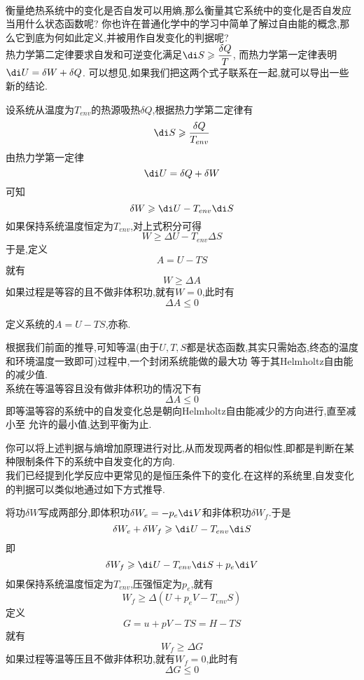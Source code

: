\documentclass{ctexart}
\begin{document}
\pagestyle{plain}
\noindent{}\vspace{15pt}\\
\indent 衡量绝热系统中的变化是否自发可以用熵,那么衡量其它系统中的变化是否自发应当用什么状态函数呢?%
你也许在普通化学中的学习中简单了解过自由能的概念,那么它到底为何如此定义,并被用作自发变化的判据呢?\vspace{12pt}\\
\indent 热力学第二定律要求自发和可逆变化满足$\di S\geqslant\dfrac{\delta Q}{T}$,%
而热力学第一定律表明$\di U=\delta W+\delta Q$.%
可以想见,如果我们把这两个式子联系在一起,就可以导出一些新的结论.
\begin{derivation}
    设系统从温度为$T_{env}$的热源吸热$\delta Q$,根据热力学第二定律有
    \[\di S\geqslant\dfrac{\delta Q}{T_{env}}\]
    由热力学第一定律
    \[\di U=\delta Q+\delta W\]
    可知
    \[\delta W\geqslant \di U-T_{env}\di S\]
    如果保持系统温度恒定为$T_{env}$,对上式积分可得
    \[W\geqslant \Delta U-T_{env}\Delta S\]
    于是,定义
    \[A=U-TS\]
    就有
    \[W\geqslant \Delta A\]
    如果过程是等容的且不做非体积功,就有$W=0$,此时有
    \[\Delta A\leqslant0\]

\end{derivation}
\begin{definition}
    定义系统的$A=U-TS$,亦称.
\end{definition}
\begin{theorem}[3E.1.2 Helmholtz自由能用于自发过程的判据]
    根据我们前面的推导,可知等温(由于$U,T,S$都是状态函数,其实只需始态,终态的温度和环境温度一致即可)过程中,一个封闭系统能做的最大功%
    等于其Helmholtz自由能的减少值.\\
    系统在等温等容且没有做非体积功的情况下有
    \[\Delta A\leqslant0\]
    即等温等容的系统中的自发变化总是朝向Helmholtz自由能减少的方向进行,直至减小至%
    允许的最小值,达到平衡为止.
\end{theorem}
你可以将上述判据与熵增加原理进行对比,从而发现两者的相似性,即都是判断在某种限制条件下的系统中自发变化的方向.\vspace{12pt}\\
\indent 我们已经提到化学反应中更常见的是恒压条件下的变化.在这样的系统里,自发变化的判据可以类似地通过如下方式推导.
\begin{derivation}
    将功$\delta W$写成两部分,即体积功$\delta W_e=-p_e\di V$和非体积功$\delta W_f$.于是
    \[\delta W_e+\delta W_f\geqslant \di U-T_{env}\di S\]
    即
    \[\delta W_f\geqslant \di U-T_{env}\di S+p_e\di V\]
    如果保持系统温度恒定为$T_{env}$,压强恒定为$p_e$,就有
    \[W_f\geqslant\Delta\left(U+p_eV-T_{env}S\right)\]
    定义
    \[G=u+pV-TS=H-TS\]
    就有
    \[W_f\geqslant\Delta G\]
    如果过程等温等压且不做非体积功,就有$W_f=0$,此时有
    \[\Delta G\leqslant0\]

\end{derivation}
\end{document}

